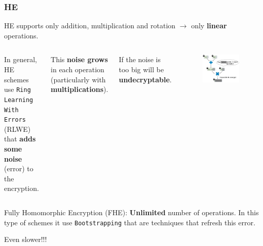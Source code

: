\documentclass[10pt,handout]{beamer}
\begin{document}
\begin{frame}
            \frametitle{HE}
    HE supports only addition, multiplication and rotation $\rightarrow$ only \textbf{linear} operations.
\pause
    \vspace{0.3cm}
  \begin{columns}
      In general, HE schemes use \texttt{Ring Learning With Errors} (RLWE) that
      \textbf{adds some noise} (error) to the encryption.

\pause
\vspace{0.3cm}
      This \textbf{noise grows} in each operation (particularly with \textbf{multiplications}).

\vspace{0.3cm}
      If the noise is too big will be \textbf{undecryptable}.
\pause
        \begin{figure}[h!]
            \centering
            \includegraphics[scale=0.2]{multNoise.jpg}
        \end{figure}

\end{columns}

\pause
    Fully Homomorphic Encryption (FHE): \textbf{Unlimited} number of operations. In this type of schemes
    it use \texttt{Bootstrapping} that are techniques that refresh this error.

\pause
    Even slower!!!
\end{frame}
\end{document}

